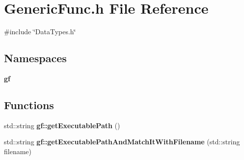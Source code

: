 \section{Generic\+Func.\+h File Reference}
\label{_generic_func_8h}
{\ttfamily \#include \char`\"{}Data\+Types.\+h\char`\"{}}\newline
\subsection*{Namespaces}
\begin{DoxyCompactItemize}
\item 
 \textbf{ gf}
\end{DoxyCompactItemize}
\subsection*{Functions}
\begin{DoxyCompactItemize}
\item 
std\+::string \textbf{ gf\+::get\+Executable\+Path} ()
\item 
std\+::string \textbf{ gf\+::get\+Executable\+Path\+And\+Match\+It\+With\+Filename} (std\+::string filename)
\end{DoxyCompactItemize}
